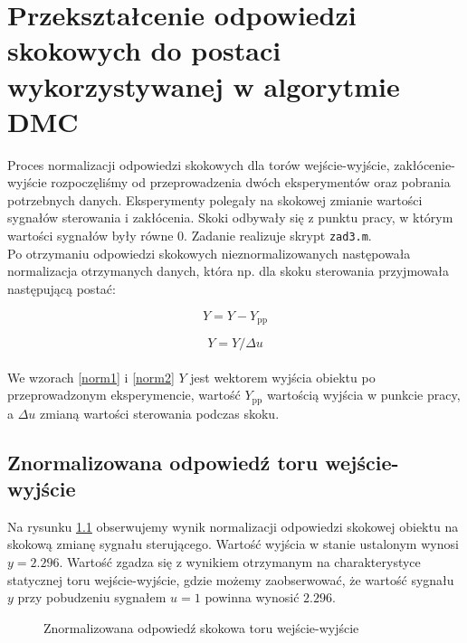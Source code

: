 \chapter{Przekształcenie odpowiedzi skokowych do postaci wykorzystywanej w algorytmie DMC}
\label{zad3}
Proces normalizacji odpowiedzi skokowych dla torów wejście-wyjście, zakłócenie-wyjście rozpoczęliśmy od przeprowadzenia dwóch eksperymentów oraz pobrania potrzebnych danych. Eksperymenty polegały na skokowej zmianie wartości sygnałów sterowania i zakłócenia. Skoki odbywały się z punktu pracy, w którym wartości sygnałów były równe 0. Zadanie realizuje skrypt \verb+zad3.m+.\\
\indent{} Po otrzymaniu odpowiedzi skokowych nieznormalizowanych następowała normalizacja otrzymanych danych, która np. dla skoku sterowania przyjmowała następującą postać:

\begin{equation}
\label{norm1}
Y = Y - Y_{\mathrm{pp}}
\end{equation}

\begin{equation}
\label{norm2}
Y = Y / \Delta u
\end{equation}
\\
We wzorach \ref{norm1} i \ref{norm2} $Y$ jest wektorem wyjścia obiektu po przeprowadzonym eksperymencie, wartość $Y_{\mathrm{pp}}$ wartością wyjścia w punkcie pracy, a $\Delta u$ zmianą wartości sterowania podczas skoku.

\section{Znormalizowana odpowiedź toru wejście-wyjście}
Na rysunku \ref{zad3_norm_odp_u} obserwujemy wynik normalizacji odpowiedzi skokowej obiektu na skokową zmianę sygnału sterującego. Wartość wyjścia w stanie ustalonym wynosi $y = \num{2,296}$. Wartość zgadza się z wynikiem otrzymanym na charakterystyce statycznej toru wejście-wyjście, gdzie możemy zaobserwować, że wartość sygnału $y$ przy pobudzeniu sygnałem $u = 1$ powinna wynosić $\num{2,296}$.   

\begin{figure}[t]
    \centering
    \caption{Znormalizowana odpowiedź skokowa toru wejście-wyjście}
    \label{zad3_norm_odp_u}
\end{figure}


